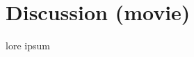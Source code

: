 \documentclass[english]{article}
\begin{document}


\section{Discussion (movie)}
lore ipsum
\end{document}

